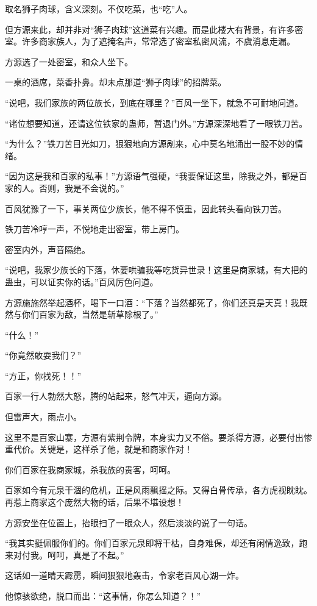 \begin{this_body}
取名狮子肉球，含义深刻。不仅吃菜，也“吃”人。

但方源来此，却并非对“狮子肉球”这道菜有兴趣。而是此楼大有背景，有许多密室。许多商家族人，为了遮掩名声，常常选了密室私密风流，不虞消息走漏。

方源选了一处密室，和众人坐下。

一桌的酒席，菜香扑鼻。却未点那道“狮子肉球”的招牌菜。

“说吧，我们家族的两位族长，到底在哪里？”百风一坐下，就急不可耐地问道。

“诸位想要知道，还请这位铁家的蛊师，暂退门外。”方源深深地看了一眼铁刀苦。

“为什么？”铁刀苦目光如刀，狠狠地向方源剐来，心中莫名地涌出一股不妙的情绪。

“因为这是我和百家的私事！”方源语气强硬，“我要保证这里，除我之外，都是百家的人。否则，我是不会说的。”

百风犹豫了一下，事关两位少族长，他不得不慎重，因此转头看向铁刀苦。

铁刀苦冷哼一声，不悦地走出密室，带上房门。

密室内外，声音隔绝。

“说吧，我家少族长的下落，休要哄骗我等吃货异世录！这里是商家城，有大把的蛊虫，可以证实你的话。”百风厉色问道。

方源施施然举起酒杯，喝下一口酒：“下落？当然都死了，你们还真是天真！我既然与你们百家为敌，当然是斩草除根了。”

“什么！”

“你竟然敢耍我们？”

“方正，你找死！！”

百家一行人勃然大怒，腾的站起来，怒气冲天，逼向方源。

但雷声大，雨点小。

这里不是百家山寨，方源有紫荆令牌，本身实力又不俗。要杀得方源，必要付出惨重代价。关键是，这样杀了他，就是和商家作对！

你们百家在我商家城，杀我族的贵客，呵呵。

百家如今有元泉干涸的危机，正是风雨飘摇之际。又得白骨传承，各方虎视眈眈。再惹上商家这个庞然大物的话，后果不堪设想！

方源安坐在位置上，抬眼扫了一眼众人，然后淡淡的说了一句话。

“我其实挺佩服你们的。你们百家元泉即将干枯，自身难保，却还有闲情逸致，跑来对付我。呵呵，真是了不起。”

这话如一道晴天霹雳，瞬间狠狠地轰击，令家老百风心湖一炸。

他惊骇欲绝，脱口而出：“这事情，你怎么知道？！”


\end{this_body}
